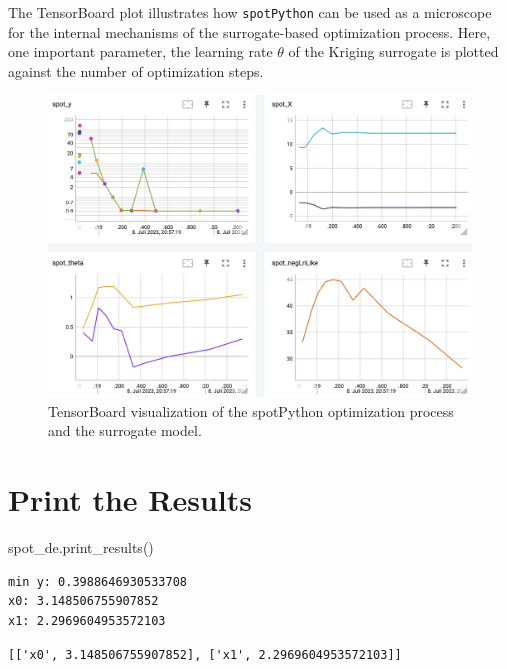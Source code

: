 \documentclass[
  letterpaper,
  DIV=11,
  numbers=noendperiod]{scrreprt}
\newenvironment{Shaded}{\begin{snugshade}}{\end{snugshade}}
\newcommand{\NormalTok}[1]{\textcolor[rgb]{0.00,0.23,0.31}{#1}}
\begin{document}
The TensorBoard plot illustrates how \texttt{spotPython} can be used as
a microscope for the internal mechanisms of the surrogate-based
optimization process. Here, one important parameter, the learning rate
\(\theta\) of the Kriging surrogate is plotted against the number of
optimization steps.

\begin{figure}[H]

{\centering \includegraphics[width=1\textwidth,height=\textheight]{figures_static/05_tensorboard_01.png}

}

\caption{TensorBoard visualization of the spotPython optimization
process and the surrogate model.}

\end{figure}%

\section{Print the Results}\label{print-the-results}

\begin{Shaded}
\begin{Highlighting}[]
\NormalTok{spot\_de.print\_results()}
\end{Highlighting}
\end{Shaded}

\begin{verbatim}
min y: 0.3988646930533708
x0: 3.148506755907852
x1: 2.2969604953572103
\end{verbatim}

\begin{verbatim}
[['x0', 3.148506755907852], ['x1', 2.2969604953572103]]
\end{verbatim}
\end{document}
